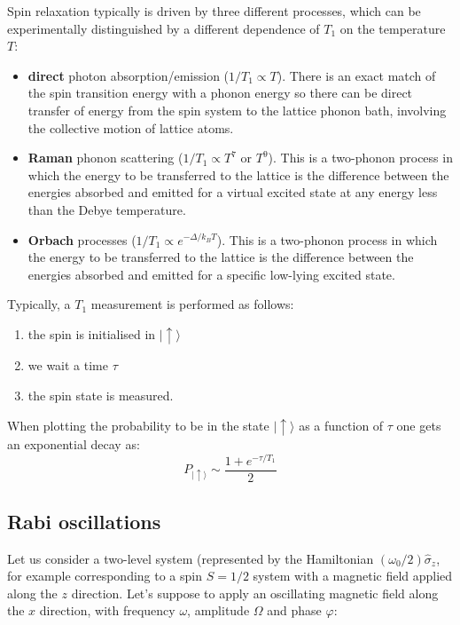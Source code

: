 \documentclass[a4paper,11pt]{article}
\newcommand{\ket}[1]{| #1 \rangle}
\begin{document}
Spin relaxation typically is driven by three different processes, which can be experimentally distinguished by a different dependence of $T_1$ on the temperature $T$:
\begin{itemize}
    \item {\bf direct} photon absorption/emission ($1/T_1 \propto T$). There is an exact match of the spin transition energy with a phonon energy so there can be direct transfer of energy from the spin system to the lattice phonon bath, involving the collective motion of lattice atoms.
    \item {\bf Raman} phonon scattering ($1/T_1 \propto T^7$ or $T^9$). This is a two-phonon process in which the energy to be transferred to the lattice is the difference between the energies absorbed and emitted for a virtual excited state at any energy less than the Debye temperature.
    \item {\bf Orbach} processes ($1/T_1 \propto e^{-\Delta/k_B T}$). This is a two-phonon process in which the energy to be transferred to the lattice is the difference between the energies absorbed and emitted for a specific low-lying excited state.
\end{itemize}

Typically, a $T_1$ measurement is performed as follows:
\begin{enumerate}
\item the spin is initialised in $\ket{\uparrow}$
\item we wait a time $\tau$ 
\item the spin state is measured.
\end{enumerate}
When plotting the probability to be in the state $\ket{\uparrow}$ as a function of $\tau$ one gets an exponential decay as:
\begin{equation}
    P_{\ket{\uparrow}} \sim \frac{1 + e^{-\tau/T_1}}{2}
    \label {eq:T1}
\end{equation}

\subsection {Rabi oscillations}
Let us consider a two-level system (represented by the Hamiltonian $(\omega_0/2)\hat{\sigma}_z$, for example corresponding to a spin $S=1/2$ system with a magnetic field applied along the $z$ direction. Let's suppose to apply an oscillating magnetic field along the $x$ direction, with frequency $\omega$, amplitude $\Omega$ and phase $\varphi$:
\end{document}
